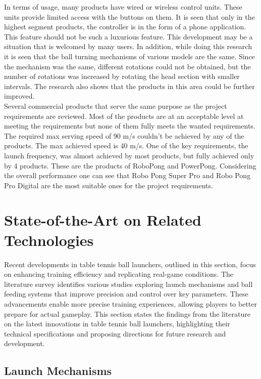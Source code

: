 \documentclass[12pt]{article}
\begin{document}
In terms of usage, many products have wired or wireless control units. These units provide limited access with the buttons on them. It is seen that only in the highest segment products, the controller is in the form of a phone application. This feature should not be such a luxurious feature. This development may be a situation that is welcomed by many users. In addition, while doing this research it is seen that the ball turning mechanisms of various models are the same. Since the mechanism was the same, different rotations could not be obtained, but the number of rotations was increased by rotating the head section with smaller intervals. The research also shows that the products in this area could be further improved. \\

Several commercial products that serve the same purpose as the project requirements are reviewed. Most of the products are at an acceptable level at meeting the requirements but none of them fully meets the wanted requirements. The required max serving speed of 90 m/s couldn’t be achieved by any of the products. The max achieved speed is 40 m/s. One of the key requirements, the launch frequency, was almost achieved by most products, but fully achieved only by 4 products. These are the products of RoboPong and PowerPong. Considering the overall performance one can see that Robo Pong Super Pro and Robo Pong Pro Digital are the most suitable ones for the project requirements.

\section{State-of-the-Art on Related Technologies}

Recent developments in table tennis ball launchers, outlined in this section, focus on enhancing training efficiency and replicating real-game conditions. The literature survey identifies various studies exploring launch mechanisms and ball feeding systems that improve precision and control over key parameters. These advancements enable more precise training experiences, allowing players to better prepare for actual gameplay. This section states the findings from the literature on the latest innovations in table tennis ball launchers, highlighting their technical specifications and proposing directions for future research and development. 

\subsection{Launch Mechanisms}
\end{document}

